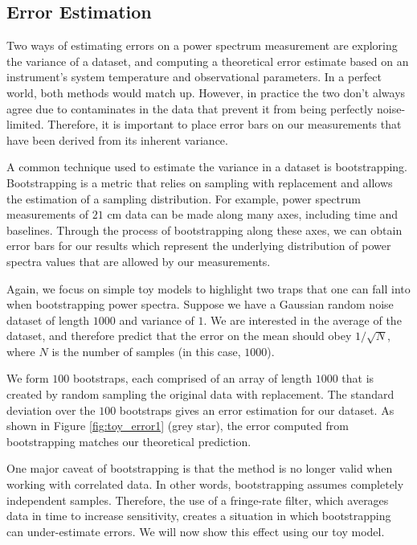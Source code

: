 \documentclass[preprint2,numberedappendix,tighten,twocolappendix]{aastex6}  %
\begin{document}
\subsection{Error Estimation}
\label{sec:ErrorOverview}

Two ways of estimating errors on a power spectrum measurement are exploring the variance of a dataset, and computing a theoretical error estimate based on an instrument's system temperature and observational parameters. In a perfect world, both methods would match up. However, in practice the two don't always agree due to contaminates in the data that prevent it from being perfectly noise-limited. Therefore, it is important to place error bars on our measurements that have been derived from its inherent variance.

A common technique used to estimate the variance in a dataset is bootstrapping. Bootstrapping is a metric that relies on sampling with replacement and allows the estimation of a sampling distribution. For example, power spectrum measurements of $21$ cm data can be made along many axes, including time and baselines. Through the process of bootstrapping along these axes, we can obtain error bars for our results which represent the underlying distribution of power spectra values that are allowed by our measurements.

Again, we focus on simple toy models to highlight two traps that one can fall into when bootstrapping power spectra. Suppose we have a Gaussian random noise dataset of length $1000$ and variance of $1$. We are interested in the average of the dataset, and therefore predict that the error on the mean should obey $1/\sqrt{N}$, where $N$ is the number of samples (in this case, $1000$). 

We form $100$ bootstraps, each comprised of an array of length $1000$ that is created by random sampling the original data with replacement. The standard deviation over the $100$ bootstraps gives an error estimation for our dataset. As shown in Figure \ref{fig:toy_error1} (grey star), the error computed from bootstrapping matches our theoretical prediction.

One major caveat of bootstrapping is that the method is no longer valid when working with correlated data. In other words, bootstrapping assumes completely independent samples. Therefore, the use of a fringe-rate filter, which averages data in time to increase sensitivity, creates a situation in which bootstrapping can under-estimate errors. We will now show this effect using our toy model.
\end{document}
